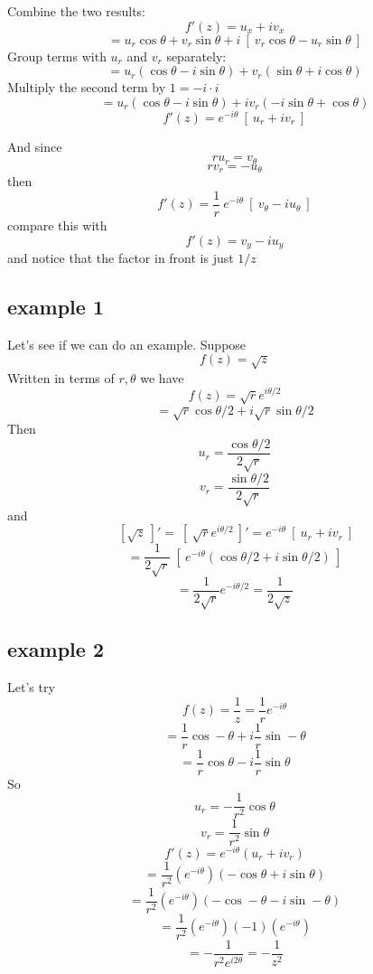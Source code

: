 \documentclass[11pt, oneside]{article}
\begin{document}
Combine the two results:
\[ f'(z) = u_x + i v_x \]
\[ = u_r \cos \theta + v_r \sin \theta + i \ [ \ v_r \cos \theta - u_r \sin \theta \ ] \]
Group terms with $u_r$ and $v_r$ separately:
\[ = u_r (\cos \theta - i \sin \theta) + v_r (\sin \theta + i \cos \theta)  \]
Multiply the second term by $1 = - i \cdot i$
\[ = u_r (\cos \theta - i \sin \theta) + i v_r (- i \sin \theta + \cos \theta)  \]
\[ f'(z) = e^{-i \theta} \ [ \ u_r + i v_r \ ] \]

And since
\[ r u_r = v_{\theta} \]
\[ r v_r = -u_{\theta} \]
then
\[ f'(z) = \frac{1}{r} \ e^{-i \theta} \ [ \ v_{\theta} - i u_{\theta} \ ] \]
compare this with 
\[ f'(z) = v_y - iu_y \]
and notice that the factor in front is just $1/z$

\subsection*{example 1}

Let's see if we can do an example.  Suppose
\[ f(z) = \sqrt{z} \]
Written in terms of $r, \theta$ we have
\[ f(z) = \sqrt{r} e^{i \theta/2} \]
\[ = \sqrt{r} \cos \theta/2 + i \sqrt{r} \sin \theta/2 \]
Then
\[ u_r = \frac{\cos \theta/2}{2 \sqrt{r}} \]
\[ v_r = \frac{\sin \theta/2}{2 \sqrt{r}} \]
and
\[ \ [ \sqrt{z} \ ]' = \ [ \ \sqrt{r} e^{i \theta/2} \ ]' = e^{-i \theta} \ [ \ u_r + i v_r \ ] \]
\[ = \frac{1}{2 \sqrt{r}} \ [ \ e^{-i \theta} (\cos \theta/2 + i \sin \theta/2) \ ]    \]
\[ = \frac{1}{2 \sqrt{r}} e^{-i \theta/2} = \frac{1}{2 \sqrt{z}} \]

\subsection*{example 2}
Let's try
\[ f(z) = \frac{1}{z} = \frac{1}{r} e^{-i \theta} \]
\[ = \frac{1}{r} \cos - \theta + i \frac{1}{r} \sin - \theta \]
\[ = \frac{1}{r} \cos \theta - i \frac{1}{r} \sin \theta \]
So
\[ u_r = -\frac{1}{r^2} \cos \theta \]
\[ v_r = \frac{1}{r^2} \sin \theta \]
\[ f'(z) = e^{-i \theta}  (u_r + i v_r) \]
\[ = \frac{1}{r^2} ( e^{-i \theta}) (- \cos \theta + i \sin \theta) \]
\[ = \frac{1}{r^2} ( e^{-i \theta}) (- \cos - \theta - i \sin - \theta) \]
\[ = \frac{1}{r^2} ( e^{-i \theta}) (-1) (e^{-i \theta}) \]
\[ = -\frac{1}{r^2 e^{i 2\theta}} = -\frac{1}{z^2} \]
\end{document}
